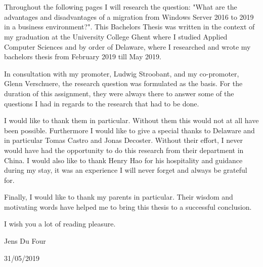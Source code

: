 
\chapter*{}
\label{ch:voorwoord}

Throughout the following pages I will research the question: "What are the advantages and disadvantages of a migration from Windows Server 2016 to 2019 in a business environment?". This Bachelors Thesis was written in the context of my graduation at the University College Ghent where I studied Applied Computer Sciences and by order of Delaware, where I researched and wrote my bachelors thesis from February 2019 till May 2019.

In consultation with my promoter, Ludwig Stroobant, and my co-promoter, Glenn Verschuere, the research question was formulated as the basis. For the duration of this assignment, they were always there to answer some of the questions I had in regards to the research that had to be done. 

I would like to thank them in particular. Without them this would not at all have been possible.
Furthermore I would like to give a special thanks to Delaware and in particular Tomas Castro and Jonas Decoster. Without their effort, I never would have had the opportunity to do this research from their department in China. I would also like to thank Henry Hao for his hospitality and guidance during my stay, it was an experience I will never forget and always be grateful for. 

Finally, I would like to thank my parents in particular. Their wisdom and motivating words have helped me to bring this thesis to a successful conclusion.

I wish you a lot of reading pleasure.

Jens Du Four

31/05/2019
